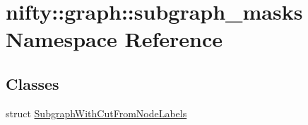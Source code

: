 \hypertarget{namespacenifty_1_1graph_1_1subgraph__masks}{}\section{nifty\+:\+:graph\+:\+:subgraph\+\_\+masks Namespace Reference}
\label{namespacenifty_1_1graph_1_1subgraph__masks}
\subsection*{Classes}
\begin{DoxyCompactItemize}
\item 
struct \hyperlink{structnifty_1_1graph_1_1subgraph__masks_1_1SubgraphWithCutFromNodeLabels}{Subgraph\+With\+Cut\+From\+Node\+Labels}
\end{DoxyCompactItemize}
